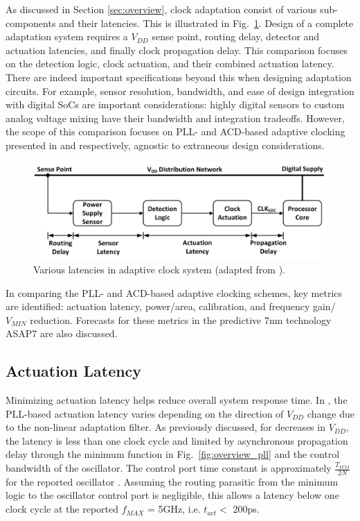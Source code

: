 \documentclass[twoside,9pt,journal,letterpage]{IEEEtran}
\begin{document}
As discussed in Section \ref{sec:overview}, clock adaptation consist of various sub-components and their latencies. This is illustrated in Fig.\ \ref{fig:scope}. Design of a complete adaptation system requires a $V_{DD}$ sense point, routing delay, detector and actuation latencies, and finally clock propagation delay. This comparison focuses on the detection logic, clock actuation, and their combined actuation latency. There are indeed important specifications beyond this when designing adaptation circuits. For example, sensor resolution, bandwidth, and ease of design integration with digital SoCs are important considerations: highly digital sensors \cite{hashimoto2018,wilcox2015} to custom analog voltage mixing \cite{kurd2009} have their bandwidth and integration tradeoffs. However, the scope of this comparison focuses on PLL- and ACD-based adaptive clocking presented in \cite{hashimoto2018} and \cite{wilcox2015} respectively, agnostic to extraneous design considerations.

\begin{figure}[h]
	\centering
	\includegraphics[width=\columnwidth]{fig_scope}
	\caption{Various latencies in adaptive clock system (adapted from \cite{hashimoto2018}).}
	\label{fig:scope}
\end{figure}

In comparing the PLL- and ACD-based adaptive clocking schemes, key metrics are identified: actuation latency, power/area, calibration, and frequency gain/$V_{MIN}$ reduction. Forecasts for these metrics in the predictive 7nm technology ASAP7 \cite{asap7} are also discussed.

\subsection{Actuation Latency}
\label{sec:ActuationLatency}
Minimizing actuation latency helps reduce overall system response time. In \cite{hashimoto2018}, the PLL-based actuation latency varies depending on the direction of $V_{DD}$ change due to the non-linear adaptation filter. As previously discussed, for decreases in $V_{DD}$, the latency is less than one clock cycle and limited by asynchronous propagation delay through the minimum function in Fig.\ \ref{fig:overview_pll} and the control bandwidth of the oscillator. The control port time constant is approximately $\frac{T_{VCO}}{2N}$ for the reported oscillator \cite{hashimoto2018}. Assuming the routing parasitic from the minimum logic to the oscillator control port is negligible, this allows a latency below one clock cycle at the reported $f_{MAX}$ = 5GHz, i.e. $t_{act} <$ 200ps.
\end{document}
